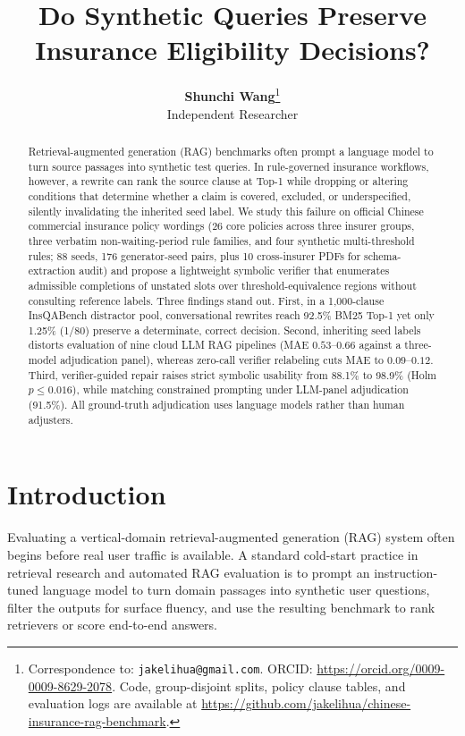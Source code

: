\documentclass[10pt,twocolumn]{article}
\title{\textbf{Do Synthetic Queries Preserve Insurance Eligibility Decisions?}}
\author{
  \textbf{Shunchi Wang}\thanks{Correspondence to: \texttt{jakelihua@gmail.com}. ORCID: \url{https://orcid.org/0009-0009-8629-2078}. Code, group-disjoint splits, policy clause tables, and evaluation logs are available at \url{https://github.com/jakelihua/chinese-insurance-rag-benchmark}.} \\
  Independent Researcher
}
\date{}
\renewcommand{\_}{\textunderscore\allowbreak}
\begin{document}
\maketitle

\begin{abstract}
Retrieval-augmented generation (RAG) benchmarks often prompt a language model to turn source passages into synthetic test queries. In rule-governed insurance workflows, however, a rewrite can rank the source clause at Top-1 while dropping or altering conditions that determine whether a claim is covered, excluded, or underspecified, silently invalidating the inherited seed label. We study this failure on official Chinese commercial insurance policy wordings (26 core policies across three insurer groups, three verbatim non-waiting-period rule families, and four synthetic multi-threshold rules; 88 seeds, 176 generator-seed pairs, plus 10 cross-insurer PDFs for schema-extraction audit) and propose a lightweight symbolic verifier that enumerates admissible completions of unstated slots over threshold-equivalence regions without consulting reference labels. Three findings stand out. First, in a 1{,}000-clause InsQABench distractor pool, conversational rewrites reach 92.5\% BM25 Top-1 yet only 1.25\% (1/80) preserve a determinate, correct decision. Second, inheriting seed labels distorts evaluation of nine cloud LLM RAG pipelines (MAE $0.53\text{--}0.66$ against a three-model adjudication panel), whereas zero-call verifier relabeling cuts MAE to $0.09\text{--}0.12$. Third, verifier-guided repair raises strict symbolic usability from 88.1\% to 98.9\% (Holm $p \le 0.016$), while matching constrained prompting under LLM-panel adjudication (91.5\%). All ground-truth adjudication uses language models rather than human adjusters.
\end{abstract}

\section{Introduction}
Evaluating a vertical-domain retrieval-augmented generation (RAG) system often begins before real user traffic is available. A standard cold-start practice in retrieval research \cite{dai2023promptagator,jeronymo2023inparsv2} and automated RAG evaluation \cite{saadfalcon2024ares,es2024ragas,zhu2025rageval,filice2025datamorgana} is to prompt an instruction-tuned language model to turn domain passages into synthetic user questions, filter the outputs for surface fluency, and use the resulting benchmark to rank retrievers or score end-to-end answers.
\end{document}
